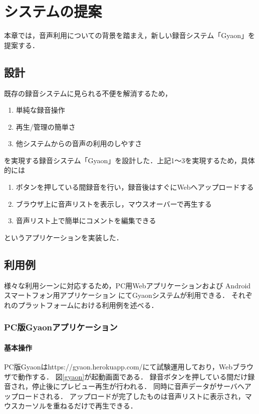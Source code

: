 \chapter{システムの提案}
\label{chap:proposal}

本章では，音声利用についての背景を踏まえ，新しい録音システム「Gyaon」を提案する．

\newpage

\section{設計}

既存の録音システムに見られる不便を解消するため，

\begin{enumerate}
\item 単純な録音操作
\item 再生/管理の簡単さ
\item 他システムからの音声の利用のしやすさ
\end{enumerate}

を実現する録音システム「Gyaon」を設計した．上記1〜3を実現するため，具体的には

\begin{enumerate}
\item ボタンを押している間録音を行い，録音後はすぐにWebへアップロードする
\item ブラウザ上に音声リストを表示し，マウスオーバーで再生する
\item 音声リスト上で簡単にコメントを編集できる
\end{enumerate}

というアプリケーションを実装した．

\section{利用例}
様々な利用シーンに対応するため，PC用Webアプリケーションおよび
Androidスマートフォン用アプリケーション
にてGyaonシステムが利用できる．
それぞれのプラットフォームにおける利用例を述べる．

\subsection{PC版Gyaonアプリケーション}

\subsubsection{基本操作}
PC版Gyaonはhttps://gyaon.herokuapp.com/にて試験運用しており，Webブラウザで動作する．
図\ref{gyaon}が起動画面である．
録音ボタンを押している間だけ録音され，停止後にプレビュー再生が行われる．
同時に音声データがサーバへアップロードされる．
アップロードが完了したものは音声リストに表示され，マウスカーソルを重ねるだけで再生できる．

